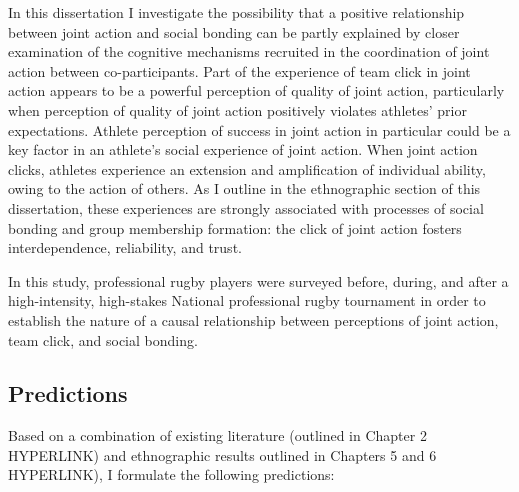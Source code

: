 In this dissertation I investigate the possibility that a positive relationship between joint action and social bonding can be partly explained by closer examination of the cognitive mechanisms recruited in the coordination of joint action between co-participants.  Part of the experience of team click in joint action appears to be a powerful perception of quality of joint action, particularly when perception of quality of joint action positively violates athletes' prior expectations.  Athlete perception of success in joint action in particular could be a key factor in an athlete's social experience of joint action.  When joint action clicks, athletes experience an extension and amplification of individual ability, owing to the action of others.  As I outline in the ethnographic section of this dissertation, these experiences are strongly associated with processes of social bonding and group membership formation: the click of joint action fosters interdependence, reliability, and trust.

In this study, professional rugby players were surveyed before, during, and after a high-intensity, high-stakes National professional rugby tournament in order to establish the nature of a causal relationship between perceptions of joint action, team click, and social bonding.

\subsection{Predictions}
Based on a combination of existing literature (outlined in Chapter 2 HYPERLINK) and ethnographic results outlined in Chapters 5 and 6 HYPERLINK), I formulate the following predictions:

